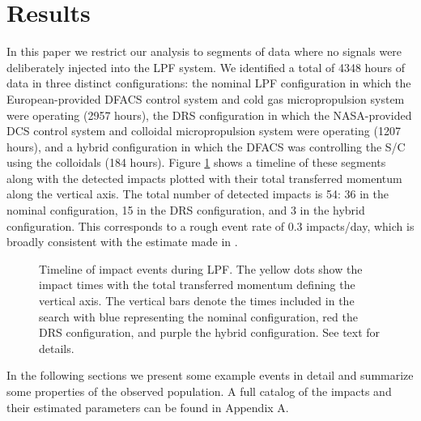 \documentclass[preprint, trackchanges]{aastex61}
\newcommand{\nhours}{4348 }
\begin{document}
\section{Results} \label{sec:results}
In this paper we restrict our analysis to segments of data where no signals were deliberately injected into the LPF system. We identified a total of \nhours hours of data in three distinct configurations: the nominal LPF configuration in which the European-provided DFACS control system and cold gas micropropulsion system were operating (2957 hours), the DRS configuration in which the NASA-provided DCS control system and colloidal micropropulsion system were operating (1207 hours), and a hybrid configuration in which the DFACS was controlling the S/C using the colloidals (184 hours). Figure \ref{fig:timeline} shows a timeline of these segments along with the detected impacts plotted with their total transferred momentum along the vertical axis. The total number of detected impacts is 54: 36 in the nominal configuration, 15 in the DRS configuration, and 3 in the hybrid configuration. This corresponds to a rough event rate of 0.3 impacts/day, which is broadly consistent with the estimate made in \cite{Thorpe:2015cxa}. 

\begin{figure}[ht!]
\caption{Timeline of impact events during LPF. The yellow dots show the impact times with the total transferred momentum defining the vertical axis. The vertical bars denote the times included in the search with blue representing the nominal configuration, red the DRS configuration, and purple the hybrid configuration. See text for details. \label{fig:timeline}}
\end{figure}

In the following sections we present some example events in detail and summarize some properties of the observed population.  A full catalog of the impacts and their estimated parameters can be found in Appendix A.

\FloatBarrier
\end{document}
